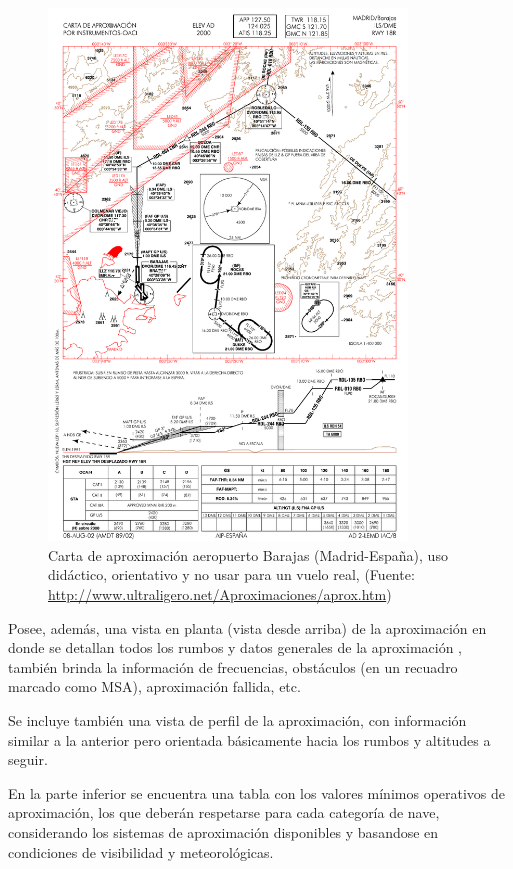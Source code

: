 \documentclass[a4paper,12pt,twoside]{article}
\begin{document}
\begin{figure}[!htb]
    \centering
    \includegraphics[width=0.85\textwidth]{Imagenes/barajas18r_cropped.pdf}
    \caption{Carta de aproximaci\'on aeropuerto Barajas (Madrid-Espa\~na), uso
    did\'actico, orientativo y no usar para un vuelo real, (Fuente: \url{http://www.ultraligero.net/Aproximaciones/aprox.htm})}
    \label{fig:carta.aproximacion.instrumental.aeropuerto.barajas}
\end{figure}

Posee, adem\'as, una vista en planta (vista desde arriba) de la aproximaci\'on en
donde se detallan todos los rumbos y datos generales de la aproximaci\'on ,
tambi\'en brinda la informaci\'on de frecuencias, obst\'aculos (en un recuadro
marcado como MSA), aproximaci\'on fallida, etc.

Se incluye tambi\'en una vista de perfil de la aproximaci\'on, con informaci\'on
similar a la anterior pero orientada b\'asicamente hacia los rumbos y altitudes
a seguir.

En la parte inferior se encuentra una tabla con los valores m\'inimos operativos
de aproximaci\'on, los que deber\'an respetarse para cada categor\'ia de nave,
considerando los sistemas de aproximaci\'on disponibles y basandose en
condiciones de visibilidad y meteorol\'ogicas.
\end{document}
